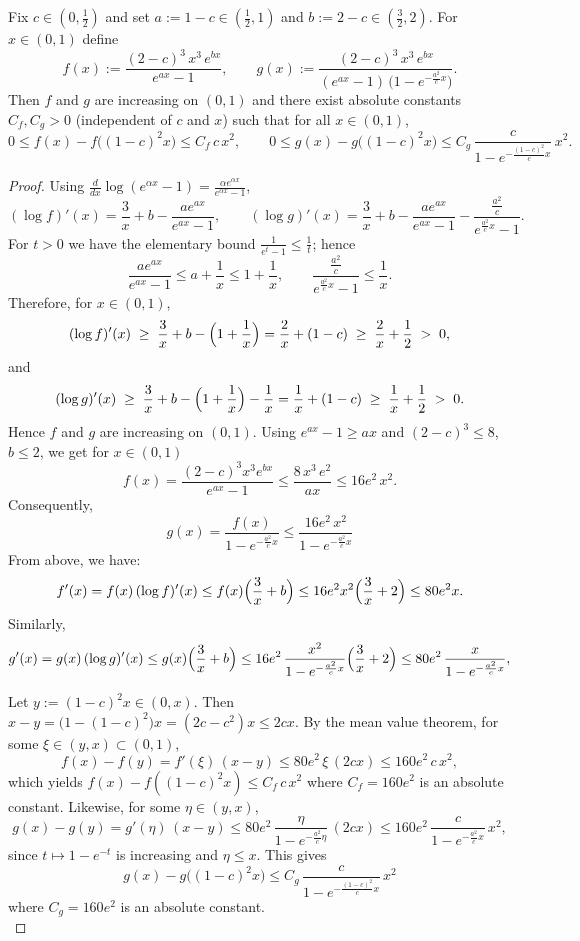 \documentclass[10pt,a4paper]{amsart}
\begin{document}
\begin{lemma}\label{utility_lemma}
Fix $c\in(0,\tfrac12)$ and set $a:=1-c\in(\tfrac12,1)$ and $b:=2-c\in(\tfrac32,2)$. For $x\in(0,1)$ define
\[
f(x):=\frac{(2-c)^3\,x^3\,e^{bx}}{e^{ax}-1}, 
\qquad
g(x):=\frac{(2-c)^3\,x^3\,e^{bx}}{(e^{ax}-1)\,\bigl(1-e^{-\frac{a^2}{c}x}\bigr)}.
\]
Then $f$ and $g$ are increasing on $(0,1)$ and there exist absolute constants $C_f,C_g>0$ (independent of $c$ and $x$) such that for all $x\in(0,1)$,
\[
0\le f(x)-f\!\big((1-c)^2x\big)\le C_f\,c\,x^2,
\qquad
0\le g(x)-g\!\big((1-c)^2x\big)\le C_g\,\frac{c}{1-e^{-\frac{(1-c)^2}{c}x}}\,x^2.
\]
\end{lemma}

\begin{proof}
Using $\frac{d}{dx}\log(e^{\alpha x}-1)=\frac{\alpha e^{\alpha x}}{e^{\alpha x}-1}$,
\[
(\log f)'(x)=\frac{3}{x}+b-\frac{a e^{ax}}{e^{ax}-1}, 
\qquad
(\log g)'(x)=\frac{3}{x}+b-\frac{a e^{ax}}{e^{ax}-1}-\frac{\frac{a^2}{c}}{e^{\frac{a^2}{c}x}-1}.
\]
For $t>0$ we have the elementary bound $\frac{1}{e^{t}-1}\le \frac{1}{t}$; hence
\[
\frac{a e^{ax}}{e^{ax}-1}\le a+\frac1x\le 1+\frac1x, 
\qquad
\frac{\frac{a^2}{c}}{e^{\frac{a^2}{c}x}-1}\le \frac{1}{x}.
\]
Therefore, for $x\in(0,1)$,
\[
(\log f)'(x)\;\ge\;\frac{3}{x}+b-\Bigl(1+\frac1x\Bigr)
= \frac{2}{x}+(1-c)\;\ge\;\frac{2}{x}+\frac12\;>\;0,
\]
and
\[
(\log g)'(x)\;\ge\;\frac{3}{x}+b-\Bigl(1+\frac1x\Bigr)-\frac1x
= \frac{1}{x}+(1-c)\;\ge\;\frac{1}{x}+\frac12\;>\;0.
\]
Hence $f$ and $g$ are increasing on $(0,1)$. Using $e^{ax}-1\ge ax$ and $(2-c)^3\le 8$, $b\le 2$, we get for $x\in(0,1)$
\[
f(x)=\frac{(2-c)^3 x^3 e^{bx}}{e^{ax}-1}
\le \frac{8\,x^3\,e^{2}}{ax}\le 16e^{2}\,x^2.
\]
Consequently,
\[
g(x)=\frac{f(x)}{1-e^{-\frac{a^2}{c}x}}
\le \frac{16e^2\,x^2}{1-e^{-\frac{a^2}{c}x}}
\]
From above, we have:
\[
f'(x)=f(x)\,(\log f)'(x)\le f(x)\Bigl(\frac{3}{x}+b\Bigr)
\le 16e^2 x^2\Bigl(\frac{3}{x}+2\Bigr)
\le 80e^2x.
\]
Similarly,
\[
g'(x)=g(x)\,(\log g)'(x)
\le g(x)\Bigl(\frac{3}{x}+b\Bigr)
\le 16e^2\,\frac{x^2}{1-e^{-\frac{a^2}{c}x}}\Bigl(\frac{3}{x}+2\Bigr)
\le 80e^2\,\frac{x}{1-e^{-\frac{a^2}{c}x}},
\]

\noindent
Let $y:=(1-c)^2x\in(0,x)$. Then $x-y=\bigl(1-(1-c)^2\bigr)x=(2c-c^2)x\le 2cx$.
By the mean value theorem, for some $\xi\in(y,x)\subset(0,1)$,
\[
f(x)-f(y)=f'(\xi)\,(x-y)\le 80e^2\,\xi\,(2cx)\le 160e^2\,c\,x^2,
\]
which yields $f(x)-f((1-c)^2x)\le C_f\,c\,x^2$ where $C_f=160e^2$ is an absolute constant. Likewise, for some $\eta\in(y,x)$,
\[
g(x)-g(y)=g'(\eta)\,(x-y)\le 80e^2\,\frac{\eta}{1-e^{-\frac{a^2}{c}\eta}}\,(2cx)
\le 160e^2\,\frac{c}{1-e^{-\frac{a^2}{c}x}}\,x^2,
\]
since $t\mapsto 1-e^{-t}$ is increasing and $\eta\le x$. This gives
\[
g(x)-g\big((1-c)^2x\big)\le C_g\,\frac{c}{1-e^{-\frac{(1-c)^2}{c}x}}\,x^2
\]
where $C_g=160e^2$ is an absolute constant. \\
\end{proof}
\end{document}
